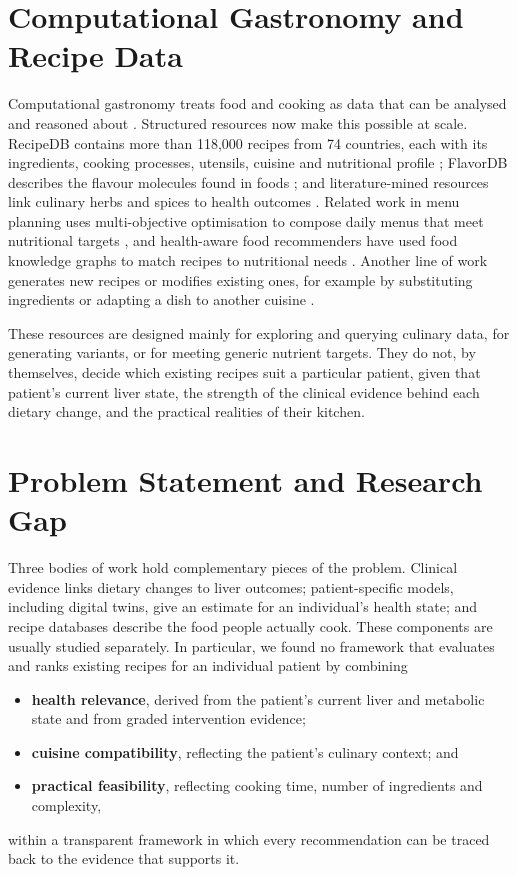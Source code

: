 \section{Computational Gastronomy and Recipe Data}
\label{sec:gastronomy}
Computational gastronomy treats food and cooking as data that can be analysed
and reasoned about \cite{bagler2024gastronomy}. Structured resources now make
this possible at scale. RecipeDB contains more than 118{,}000 recipes from 74
countries, each with its ingredients, cooking processes, utensils, cuisine and
nutritional profile \cite{batra2020recipedb}; FlavorDB describes the flavour
molecules found in foods \cite{garg2018flavordb}; and literature-mined
resources link culinary herbs and spices to health outcomes
\cite{rakhi2018spices}. Related work in menu planning uses multi-objective
optimisation to compose daily menus that meet nutritional targets
\cite{sahin2024menu}, and health-aware food recommenders have used food
knowledge graphs to match recipes to nutritional needs
\cite{trattner2017food,haussmann2019foodkg,chen2021constrained,li2022healthguided}.
Another line of work generates new recipes or modifies existing ones, for
example by substituting ingredients or adapting a dish to another cuisine
\cite{shirai2021substitutions,kim2025substitution,rita2024phytochemical,cao2024cultural}.

These resources are designed mainly for exploring and querying culinary data,
for generating variants, or for meeting generic nutrient targets. They do not,
by themselves, decide which existing recipes suit a particular patient, given
that patient's current liver state, the strength of the clinical evidence
behind each dietary change, and the practical realities of their kitchen.

\section{Problem Statement and Research Gap}
\label{sec:problem}
Three bodies of work hold complementary pieces of the problem. Clinical
evidence links dietary changes to liver outcomes; patient-specific models,
including digital twins, give an estimate for an individual's health state; and recipe
databases describe the food people actually cook. These components are
usually studied separately. In particular, we found no framework that
evaluates and ranks existing recipes for an individual patient by combining
\begin{itemize}
    \item \textbf{health relevance}, derived from the patient's current liver
          and metabolic state and from graded intervention evidence;
    \item \textbf{cuisine compatibility}, reflecting the patient's culinary
          context; and
    \item \textbf{practical feasibility}, reflecting cooking time, number of
          ingredients and complexity,
\end{itemize}
within a transparent framework in which every recommendation can be traced
back to the evidence that supports it.


